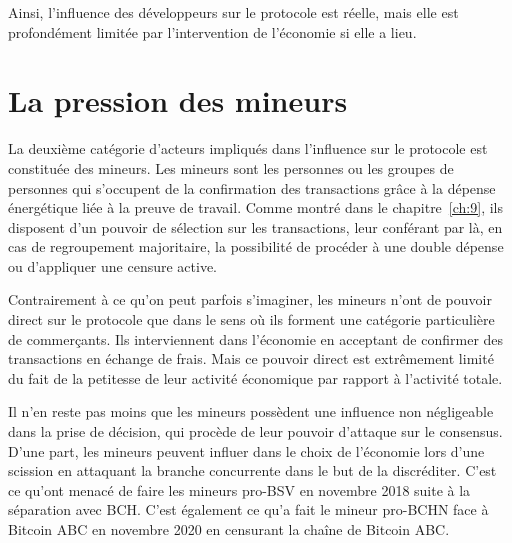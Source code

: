 Ainsi, l'influence des développeurs sur le protocole est réelle, mais elle est profondément limitée par l'intervention de l'économie si elle a lieu.

\section*{La pression des mineurs}

La deuxième catégorie d'acteurs impliqués dans l'influence sur le protocole est constituée des mineurs. Les mineurs sont les personnes ou les groupes de personnes qui s'occupent de la confirmation des transactions grâce à la dépense énergétique liée à la preuve de travail. Comme montré dans le chapitre~\ref{ch:9}, ils disposent d'un pouvoir de sélection sur les transactions, leur conférant par là, en cas de regroupement majoritaire, la possibilité de procéder à une double dépense ou d'appliquer une censure active.

Contrairement à ce qu'on peut parfois s'imaginer, les mineurs n'ont de pouvoir direct sur le protocole que dans le sens où ils forment une catégorie particulière de commerçants. Ils interviennent dans l'économie en acceptant de confirmer des transactions en échange de frais. Mais ce pouvoir direct est extrêmement limité du fait de la petitesse de leur activité économique par rapport à l'activité totale.

Il n'en reste pas moins que les mineurs possèdent une influence non négligeable dans la prise de décision, qui procède de leur pouvoir d'attaque sur le consensus. D'une part, les mineurs peuvent influer dans le choix de l'économie lors d'une scission en attaquant la branche concurrente dans le but de la discréditer. C'est ce qu'ont menacé de faire les mineurs pro-BSV en novembre 2018 suite à la séparation avec BCH. C'est également ce qu'a fait le mineur pro-BCHN face à Bitcoin ABC en novembre 2020 en censurant la chaîne de Bitcoin ABC.

